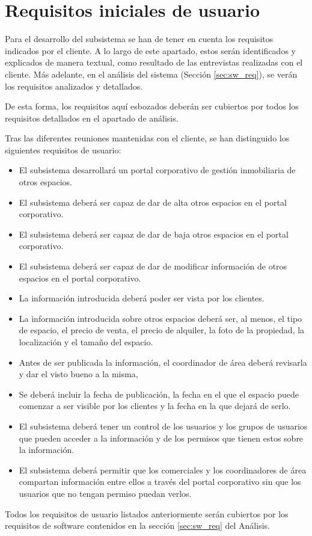 \section{Requisitos iniciales de usuario}\label{sec:user_req}
\par Para el desarrollo del subsistema se han de tener en cuenta los requisitos indicados por el cliente. A lo largo de este apartado, estos serán identificados y explicados de manera textual, como resultado de las entrevistas realizadas con el cliente. Más adelante, en el análisis del sistema (Sección \ref{sec:sw_req}), se verán los requisitos analizados y detallados.

\par De esta forma, los requisitos aquí esbozados deberán ser cubiertos por todos los requisitos detallados en el apartado de análisis.

\par Tras las diferentes reuniones mantenidas con el cliente, se han distinguido los siguientes requisitos de usuario:


\begin{itemize}[-]
    \item El subsistema desarrollará un portal corporativo de gestión inmobiliaria de otros espacios.
    \item El subsistema deberá ser capaz de dar de alta otros espacios en el portal corporativo.
    \item El subsistema deberá ser capaz de dar de baja otros espacios en el portal corporativo.
    \item El subsistema deberá ser capaz de dar de modificar información de otros espacios en el portal corporativo.
    \item La información introducida deberá poder ser vista por los clientes.
    \item La información introducida sobre otros espacios deberá ser, al menos, el tipo de espacio, el precio de venta, el  precio de alquiler, la foto de la propiedad, la localización y el tamaño del espacio.
    \item Antes de ser publicada la información, el coordinador de área deberá revisarla y dar el visto bueno a la misma,
    \item Se deberá incluir la fecha de publicación, la fecha en el que el espacio puede comenzar a ser visible por los clientes y la fecha en la que dejará de serlo.
    \item El subsistema deberá tener un control de los usuarios y los grupos de usuarios que pueden acceder a la información y de los permisos que tienen estos sobre la información.
    \item El subsistema deberá permitir que los comerciales y los coordinadores de área compartan información entre ellos a través del portal corporativo sin que los usuarios que no tengan permiso puedan verlos.
\end{itemize}

\par Todos los requisitos de usuario listados anteriormente serán cubiertos por los requisitos de software contenidos en la sección \ref{sec:sw_req} del Análisis.

